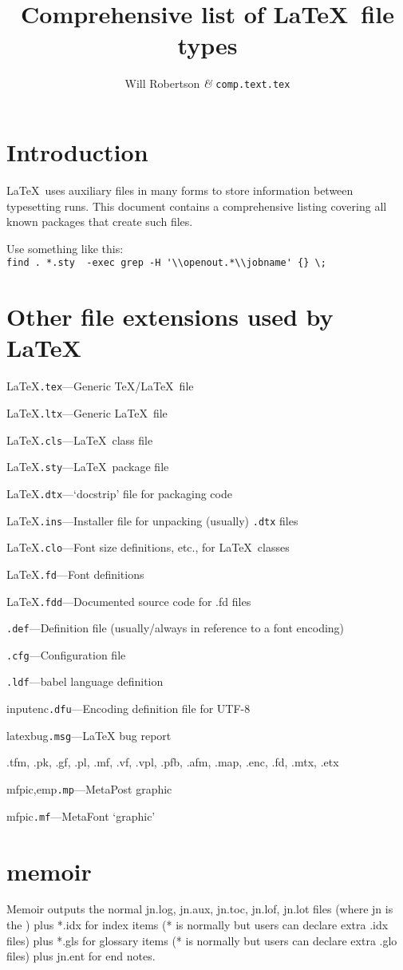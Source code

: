 \documentclass{article}
\title{Comprehensive list of \LaTeX\ file types}
\author{Will Robertson \textit\& \texttt{comp.text.tex}}
\date{}
\newcommand\ext[1]{\texttt{#1}}
\newcommand\EXT[3]{\noindent #1\quad\ext{#2}\quad---\quad#3\par}
\begin{document}
\maketitle

\section{Introduction}

\LaTeX\ uses auxiliary files in many forms to store information between typesetting runs. This document contains a comprehensive listing covering all known packages that create such files. 

Use something like this:\\\verb|find . *.sty  -exec grep -H '\\openout.*\\jobname' {} \;|

\section{Other file extensions used by \LaTeX}

\EXT{LaTeX}{.tex}{Generic \TeX/\LaTeX\ file}
\EXT{LaTeX}{.ltx}{Generic \LaTeX\ file}
\EXT{LaTeX}{.cls}{\LaTeX\ class file}
\EXT{LaTeX}{.sty}{\LaTeX\ package file}
\EXT{LaTeX}{.dtx}{`docstrip' file for packaging code}
\EXT{LaTeX}{.ins}{Installer file for unpacking (usually) \ext{.dtx} files}
\EXT{LaTeX}{.clo}{Font size definitions, etc., for \LaTeX\ classes}

\EXT{LaTeX}{.fd}{Font definitions}
\EXT{LaTeX}{.fdd}{Documented source code for .fd files}

\EXT{}{.def}{Definition file (usually/always in reference to a font encoding)}
\EXT{}{.cfg}{Configuration file}

\EXT{}{.ldf}{babel language definition}

\EXT{inputenc}{.dfu}{Encoding definition file for UTF-8}
\EXT{latexbug}{.msg}{LaTeX bug report}

.tfm, .pk, .gf, .pl, .mf,
.vf, .vpl, .pfb, .afm, .map, .enc, .fd, .mtx, .etx

\EXT{mfpic,emp}{.mp}{MetaPost graphic}
\EXT{mfpic}{.mf}{MetaFont `graphic'}

\section{memoir}

Memoir outputs the normal jn.log, jn.aux, jn.toc, jn.lof, jn.lot files (where jn is the \@jobname) plus *.idx for index items (* is normally \@jobname but users can declare extra .idx files) plus *.gls for glossary items (* is normally \@jobname but users can declare extra .glo files) plus jn.ent for end notes.
\end{document}
